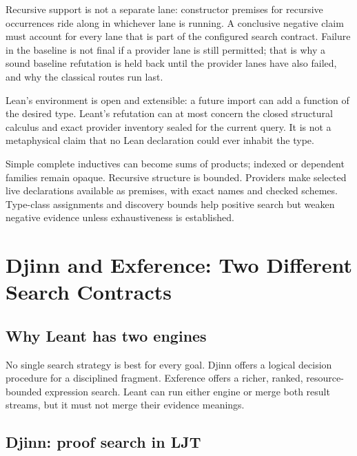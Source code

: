 \documentclass[10pt,letterpaper,oneside,openany]{report}
\begin{document}
Recursive support is not a separate lane: constructor premises for recursive occurrences ride along in whichever lane is running.  A conclusive negative claim must account for every lane that is part of the configured search contract.  Failure in the baseline is not final if a provider lane is still permitted; that is why a sound baseline refutation is held back until the provider lanes have also failed, and why the classical routes run last.

\begin{leantbox}
Lean's environment is open and extensible: a future import can add a function of the desired type.  Leant's refutation can at most concern the closed structural calculus and exact provider inventory sealed for the current query.  It is not a metaphysical claim that no Lean declaration could ever inhabit the type.
\end{leantbox}

\begin{recapbox}
Simple complete inductives can become sums of products; indexed or dependent families remain opaque.  Recursive structure is bounded.  Providers make selected live declarations available as premises, with exact names and checked schemes.  Type-class assignments and discovery bounds help positive search but weaken negative evidence unless exhaustiveness is established.
\end{recapbox}

\chapter{Djinn and Exference: Two Different Search Contracts}\label{ch:engines}

\section{Why Leant has two engines}

No single search strategy is best for every goal.  Djinn offers a logical decision procedure for a disciplined fragment.  Exference offers a richer, ranked, resource-bounded expression search.  Leant can run either engine or merge both result streams, but it must not merge their evidence meanings.

\section{Djinn: proof search in LJT}
\end{document}
